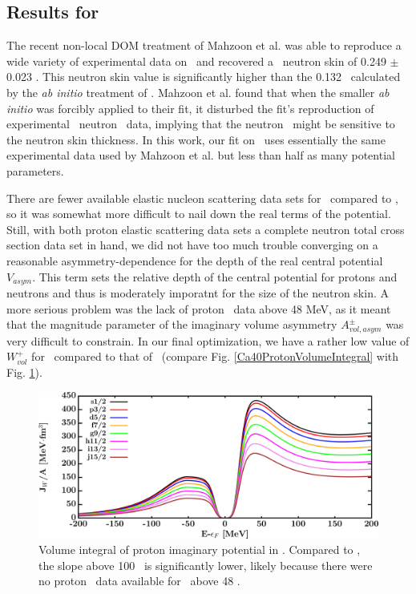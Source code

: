 \subsection{Results for \caEight}
The recent non-local DOM treatment of Mahzoon et al. \cite{Mahzoon2017} was able
to reproduce a wide variety of
experimental data on \caEight\ and recovered a \caEight\ neutron
skin of 0.249 $\pm$ 0.023 \femto\meter.
This neutron skin value is significantly higher than the 0.132 \femto\meter\ calculated by
the \textit{ab initio} treatment of \cite{Hagen2016}. Mahzoon et al. found that when the 
smaller \textit{ab initio} was forcibly applied to their fit, it disturbed the fit's
reproduction of experimental \caEight\ neutron \tot\ data, implying that the neutron \tot\ might
be sensitive to the neutron skin thickness. In this work, our fit on \caEight\ uses essentially the 
same experimental data used by Mahzoon et al. but less than half as many potential parameters.

There are fewer available elastic nucleon scattering data sets for \caEight\ compared to \caForty,
so it was somewhat more difficult to nail down the real terms of the potential. Still, with both
proton elastic scattering data sets a complete neutron total cross section data set in hand, we did
not have too much trouble converging on a reasonable asymmetry-dependence for the depth of the real
central potential $V_{asym}$. This term sets the relative depth of the central potential for protons 
and neutrons and thus is moderately imporatnt for the size of the neutron skin. A more serious
problem was the lack of proton \rxn\ data above 48 MeV, as it meant that the magnitude parameter
of the imaginary volume asymmetry $A_{vol, asym}^{\pm}$ was very difficult to constrain. In our
final optimization, we have a rather low value of $W_{vol}^{+}$ for \caEight\ compared to that of
\caForty\ (compare Fig. \ref{Ca40ProtonVolumeIntegral} with Fig.
\ref{Ca48ProtonVolumeIntegral}).

\begin{figure}[tb]
    \centering
    \includegraphics[width=\textwidth]{figures/ca48_protonVolumeIntegrals.png}
    \caption[Volume integral of proton imaginary potential in \caEight]
    {
        Volume integral of proton imaginary potential in \caEight.
        Compared to \caForty, the slope
        above 100 \mega\electronvolt\ is significantly lower, likely
        because there were no proton \rxn\ data
        available for \caEight\ above 48 \mega\electronvolt.
    }
    \label{Ca48ProtonVolumeIntegral}
\end{figure}

